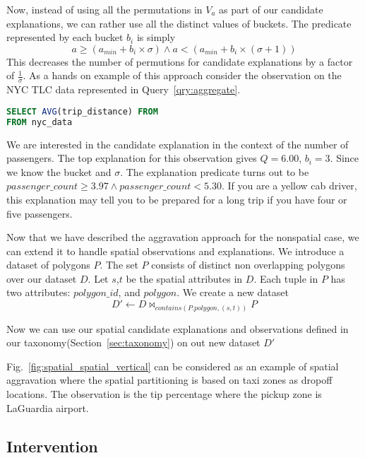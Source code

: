 Now, instead of using all the permutations in $V_a$ as part of our candidate explanations, we can rather use all the distinct values of buckets. The predicate represented by each bucket $b_i$ is simply
$$ a \geq (a_{min}+b_i\times\sigma) \wedge a < (a_{min}+b_i\times(\sigma+1))$$
This decreases the number of permutions for candidate explanations by a factor of $\frac{1}{\sigma}$. As a hands on example of this approach consider the observation on the NYC TLC data represented in Query~\ref{qry:aggregate}.

\renewcommand{\lstlistingname}{Query}%
\begin{lstlisting}[language=SQL, caption=Aggregate Query for average tip percentage, label=qry:aggregate]
SELECT AVG(trip_distance) FROM
FROM nyc_data
\end{lstlisting}

We are interested in the candidate explanation in the context of the number of passengers. The top explanation for this observation gives $Q=6.00$, $b_i=3$. Since we know the bucket and $\sigma$. The explanation predicate turns out to be $passenger\_count \geq 3.97 \wedge passenger\_count < 5.30$. If you are a yellow cab driver, this explanation may tell you to be prepared for a long trip if you have four or five passengers.

Now that we have described the aggravation approach for the nonspatial case, we can extend it to handle spatial observations and explanations. We introduce a dataset of polygons $P$. The set $P$ consists of distinct non overlapping polygons over our dataset $D$. Let $s$,$t$ be the spatial attributes in $D$. Each tuple in $P$ has two attributes: $polygon\_id$, and $polygon$. We create a new dataset
$$D' \leftarrow D \bowtie_{contains(P.polygon,(s,t))} P$$

Now we can use our spatial candidate explanations and observations defined in our taxonomy(Section~\ref{sec:taxonomy}) on out new dataset $D'$

Fig.~\ref{fig:spatial_spatial_vertical} can be considered as an example of spatial aggravation where the spatial partitioning is based on taxi zones as dropoff locations. The observation is the tip percentage where the pickup zone is LaGuardia airport.

\subsection{Intervention}
\label{sec:intervention}

